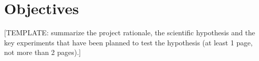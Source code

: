 \chapter{Objectives}

[TEMPLATE: summarize the project rationale, the scientific hypothesis and the key experiments that have been planned to test the hypothesis (at least 1 page, not more than 2 pages).]